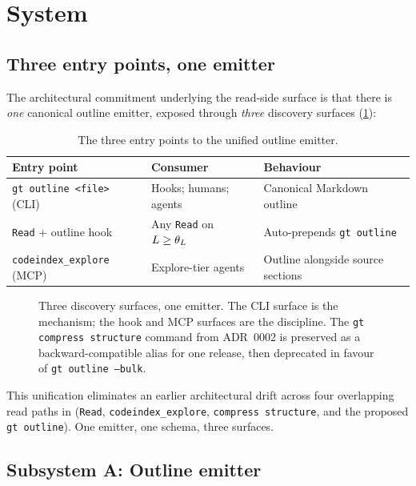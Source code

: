 \section{System}
\label{sec:system}

\subsection{Three entry points, one emitter}
\label{sec:system:unified}

The architectural commitment underlying the read-side surface is
that there is \emph{one} canonical outline emitter, exposed through
\emph{three} discovery surfaces (\cref{fig:outline-flow}):

\begin{table}[ht]
\centering
\caption{The three entry points to the unified outline emitter.}
\label{tab:entry-points}
\small
\begin{tabular}{lll}
\toprule
\textbf{Entry point} & \textbf{Consumer} & \textbf{Behaviour} \\
\midrule
\texttt{gt outline \textless file\textgreater} (CLI) & Hooks; humans; agents & Canonical Markdown outline \\
\texttt{Read} + outline hook & Any \texttt{Read} on $L \geq \theta_{L}$ & Auto-prepends \texttt{gt outline} \\
\texttt{codeindex\_explore} (MCP) & Explore-tier agents & Outline alongside source sections \\
\bottomrule
\end{tabular}
\end{table}

\begin{figure}[ht]
\centering

\caption{Three discovery surfaces, one emitter. The CLI surface is the
mechanism; the hook and MCP surfaces are the discipline. The
\texttt{gt compress structure} command from ADR~0002 is preserved as
a backward-compatible alias for one release, then deprecated in favour
of \texttt{gt outline --bulk}.}
\label{fig:outline-flow}
\end{figure}

This unification eliminates an earlier architectural drift across four
overlapping read paths in \blackrim
(\texttt{Read}, \texttt{codeindex\_explore},
\texttt{compress structure}, and the proposed \texttt{gt outline}).
One emitter, one schema, three surfaces.

\subsection{Subsystem A: Outline emitter}
\label{sec:system:emitter}

